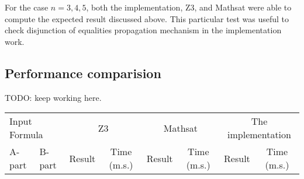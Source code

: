 For the case $n = 3, 4, 5$, both the implementation, Z3, and Mathsat were able
to compute the expected result discussed above. This particular test
was useful to check disjunction of equalities propagation mechanism in the
implementation work.

\subsection{Performance comparision}

TODO: keep working here.

\begin{tabular}{llcccccc} \toprule
  \multicolumn{2}{l}{Input Formula} & \multicolumn{2}{c}{Z3}& \multicolumn{2}{c}{Mathsat}& \multicolumn{2}{c}{The implementation} 
  \\\cmidrule(lr){1-2}\cmidrule(lr){3-4}\cmidrule(lr){5-6}\cmidrule(lr){7-8}
  A-part & B-part & Result & Time (m.s.) & Result & Time (m.s.) & Result & Time (m.s.) \\
  
\end{tabular}

